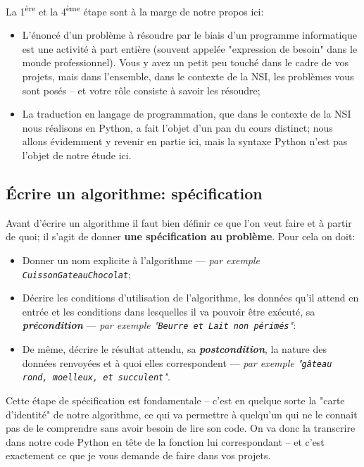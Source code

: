 \documentclass[12pt]{article}
\begin{document}
	La 1\textsuperscript{ère} et la 4\textsuperscript{ème} étape sont à la marge de notre propos ici:
	\begin{itemize}
		\item L'énoncé d'un problème à résoudre par le biais d'un programme informatique est une activité à part entière (souvent appelée "expression de besoin" dans le monde professionnel). Vous y avez un petit peu touché dans le cadre de vos projets, mais dans l'ensemble, dans le contexte de la NSI, les problèmes vous sont posés -- et votre rôle consiste à savoir les résoudre;
		\item La traduction en langage de programmation, que dans le contexte de la NSI nous réalisons en Python, a fait l'objet d'un pan du cours distinct; nous allons évidemment y revenir en partie ici, mais la syntaxe Python n'est pas l'objet de notre étude ici.
	\end{itemize}
	
	\subsection{Écrire un algorithme: spécification}
	
	Avant d'écrire un algorithme il faut bien définir ce que l'on veut faire et à partir de quoi; il s'agit de donner \textbf{une spécification au problème}. Pour cela on doit:
	\begin{itemize}
		\item Donner un nom explicite à l’algorithme --- \textit{par exemple \texttt{CuissonGateauChocolat}};
		\item Décrire les conditions d'utilisation de l'algorithme, les données qu'il attend en entrée et les conditions dans lesquelles il va pouvoir être exécuté, sa \textbf{\textit{précondition}} --- \textit{par exemple "\texttt{Beurre et Lait non périmés}"}:
		\item De même, décrire le résultat attendu, sa \textbf{\textit{postcondition}}, la nature des données renvoyées et à quoi elles correspondent --- \textit{par exemple "\texttt{gâteau rond, moelleux, et succulent}"}.
	\end{itemize}
	
	Cette étape de spécification est fondamentale -- c'est en quelque sorte la "carte d'identité" de notre algorithme, ce qui va permettre à quelqu'un qui ne le connait pas de le comprendre sans avoir besoin de lire son code. On va donc la transcrire dans notre code Python en tête de la fonction lui correspondant -- et c'est exactement ce que je vous demande de faire dans vos projets.
	
\end{document}
